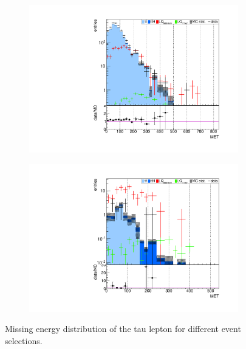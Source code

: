 \begin{figure}
\begin{subfigure}[t]{0.49\textwidth}
                \label{MET:2b2tau}
                \end{subfigure}
                \begin{subfigure}[t]{0.49\textwidth}
                \includegraphics[width=\textwidth]{figures/plots/kinLQ75/MET_2j1b_1tau.pdf}
                \label{MET:1b1tau}
                \end{subfigure}
                \begin{subfigure}[t]{0.49\textwidth}
                \includegraphics[width=\textwidth]{figures/plots/kinLQ75/MET_2j1b_2tau.pdf}
                \label{MET:1b2tau}
                \end{subfigure}
\caption[Missing energy distribution of the tau lepton for different event selections.]{Missing energy distribution of the tau lepton for different event selections.}
\label{MET}
\end{figure}

